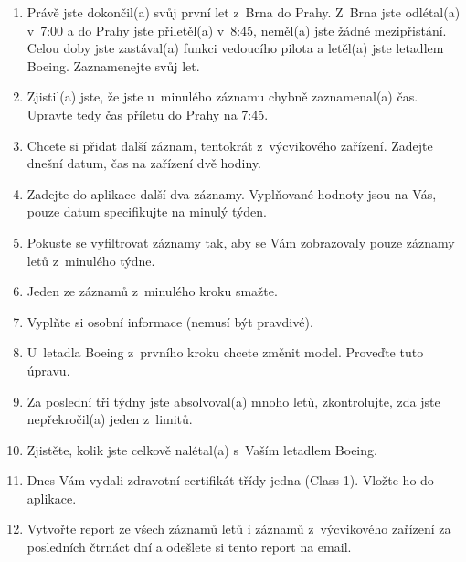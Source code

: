 \documentclass[thesis=M,czech]{FITthesis}[2012/06/26]
\begin{document}
\begin{enumerate}
\item Právě jste dokončil(a) svůj první let z~Brna do Prahy. Z~Brna jste odlétal(a) v~7:00 a do Prahy jste přiletěl(a) v~8:45, neměl(a) jste žádné mezipřistání. Celou doby jste zastával(a) funkci vedoucího pilota a letěl(a) jste letadlem Boeing. Zaznamenejte svůj let.
\item Zjistil(a) jste, že jste u~minulého záznamu chybně zaznamenal(a) čas. Upravte tedy čas příletu do Prahy na 7:45.
\item Chcete si přidat další záznam, tentokrát z~výcvikového zařízení. Zadejte dnešní datum, čas na zařízení dvě hodiny.
\item Zadejte do aplikace další dva záznamy. Vyplňované hodnoty jsou na Vás, pouze datum specifikujte na minulý týden.
\item Pokuste se vyfiltrovat záznamy tak, aby se Vám zobrazovaly pouze záznamy letů z~minulého týdne.
\item Jeden ze záznamů z~minulého kroku smažte.
\item Vyplňte si osobní informace (nemusí být pravdivé).
\item U~letadla Boeing z~prvního kroku chcete změnit model. Proveďte tuto úpravu.
\item Za poslední tři týdny jste absolvoval(a) mnoho letů, zkontrolujte, zda jste nepřekročil(a) jeden z~limitů.
\item Zjistěte, kolik jste celkově nalétal(a) s~Vaším letadlem Boeing.
\item Dnes Vám vydali zdravotní certifikát třídy jedna (Class 1). Vložte ho do aplikace.
\item Vytvořte report ze všech záznamů letů i záznamů z~výcvikového zařízení za posledních čtrnáct dní a odešlete si tento report na email.
\end{enumerate}
\end{document}
